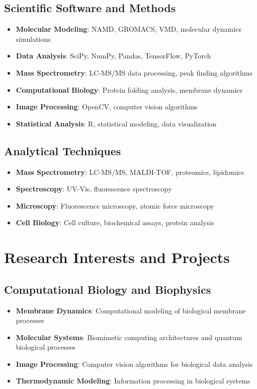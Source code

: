 \documentclass[11pt,a4paper]{article}
\begin{document}
\subsection{Scientific Software and Methods}
\begin{itemize}[leftmargin=*,itemsep=0.1em]
\item \textbf{Molecular Modeling}: NAMD, GROMACS, VMD, molecular dynamics simulations
\item \textbf{Data Analysis}: SciPy, NumPy, Pandas, TensorFlow, PyTorch
\item \textbf{Mass Spectrometry}: LC-MS/MS data processing, peak finding algorithms
\item \textbf{Computational Biology}: Protein folding analysis, membrane dynamics
\item \textbf{Image Processing}: OpenCV, computer vision algorithms
\item \textbf{Statistical Analysis}: R, statistical modeling, data visualization
\end{itemize}

\subsection{Analytical Techniques}
\begin{itemize}[leftmargin=*,itemsep=0.1em]
\item \textbf{Mass Spectrometry}: LC-MS/MS, MALDI-TOF, proteomics, lipidomics
\item \textbf{Spectroscopy}: UV-Vis, fluorescence spectroscopy
\item \textbf{Microscopy}: Fluorescence microscopy, atomic force microscopy
\item \textbf{Cell Biology}: Cell culture, biochemical assays, protein analysis
\end{itemize}

\section{Research Interests and Projects}

\subsection{Computational Biology and Biophysics}
\begin{itemize}[leftmargin=*,itemsep=0.1em]
\item \textbf{Membrane Dynamics}: Computational modeling of biological membrane processes
\item \textbf{Molecular Systems}: Biomimetic computing architectures and quantum biological processes  
\item \textbf{Image Processing}: Computer vision algorithms for biological data analysis
\item \textbf{Thermodynamic Modeling}: Information processing in biological systems
\end{itemize}
\end{document}
